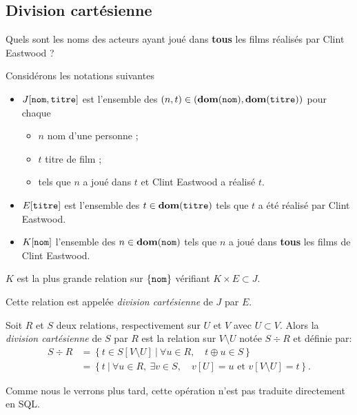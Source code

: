 \subsection{Division cartésienne}

Quels sont les noms des acteurs ayant joué dans \textbf{tous} les films réalisés par Clint Eastwood ? 

Considérons les notations suivantes
\begin{itemize}
\item  $J[\mathtt{nom}, \mathtt{titre}]$ est l'ensemble des $(n,t) \in (\mathbf{dom}(\mathtt{nom}),\mathbf{dom}(\mathtt{titre}))$ pour chaque 
  \begin{itemize}
    \item[\textbullet] $n$ nom d'une personne ;
    \item[\textbullet] $t$ titre de film ;
    \item[\textbullet] tels que $n$ a joué dans $t$ et Clint Eastwood a réalisé $t$.
  \end{itemize}
\item $E[\mathtt{titre}]$ est l'ensemble des $t \in \mathbf{dom}(\mathtt{titre})$ tels que $t$ a été réalisé par Clint Eastwood.
\item $K[\mathtt{nom}]$ l'ensemble des  $n \in \mathbf{dom}(\mathtt{nom})$ tels que $n$ a
  joué dans \textbf{tous} les films de Clint Eastwood.
\end{itemize}

$K$ est la plus grande relation sur $\left\{\mathtt{nom}\right\}$ vérifiant
$K\times E \subset J$.

Cette relation est appelée \emph{division cartésienne} de $J$ par $E$.

\begin{defi}
  Soit $R$ et $S$ deux relations, respectivement sur $U$ et $V$ avec
  $U\subset V$. Alors la \emph{division cartésienne} de $S$ par $R$
  est la relation sur $V\setminus U$ notée $S\div R$ et définie par:
  \begin{align*}
    S\div R
    &=  \left\{t  \in S[V\setminus U] ~|~ \forall u \in R, \quad t\oplus u \in S\right\}\\
    &= \left\{t ~|~ \forall u \in R,~ \exists v \in S, \quad v[U] = u \text{ et }
      v[V\setminus U]=t\right\}.
  \end{align*}
\end{defi}
Comme nous le verrons plus tard, cette opération n'est pas traduite directement en SQL.
